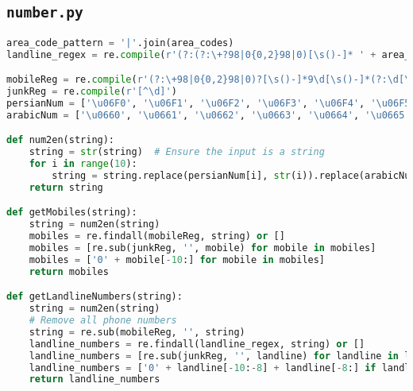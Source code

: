\documentclass{solutionclass} %
\def\co#1{\texttt{#1}}
\begin{document}
\subsection*{\co{number.py}}
\begin{lstlisting}[language=Python]
area_code_pattern = '|'.join(area_codes)
landline_regex = re.compile(r'(?:(?:\+?98|0{0,2}98|0)[\s()-]* ' + area_code_pattern + r')?[\s()-]*(?:\d[\s()-]*){11}|(?:\d[\s()-]*){8}', re.IGNORECASE)

mobileReg = re.compile(r'(?:\+98|0{0,2}98|0)?[\s()-]*9\d[\s()-]*(?:\d[\s()-]*){8}', re.IGNORECASE)
junkReg = re.compile(r'[^\d]')
persianNum = ['\u06F0', '\u06F1', '\u06F2', '\u06F3', '\u06F4', '\u06F5', '\u06F6', '\u06F7', '\u06F8', '\u06F9']
arabicNum = ['\u0660', '\u0661', '\u0662', '\u0663', '\u0664', '\u0665', '\u0666', '\u0667', '\u0668', '\u0669']

def num2en(string):
    string = str(string)  # Ensure the input is a string
    for i in range(10):
        string = string.replace(persianNum[i], str(i)).replace(arabicNum[i], str(i))
    return string

def getMobiles(string):
    string = num2en(string)
    mobiles = re.findall(mobileReg, string) or []
    mobiles = [re.sub(junkReg, '', mobile) for mobile in mobiles]
    mobiles = ['0' + mobile[-10:] for mobile in mobiles]
    return mobiles

def getLandlineNumbers(string):
    string = num2en(string)
    # Remove all phone numbers
    string = re.sub(mobileReg, '', string)
    landline_numbers = re.findall(landline_regex, string) or []
    landline_numbers = [re.sub(junkReg, '', landline) for landline in landline_numbers]
    landline_numbers = ['0' + landline[-10:-8] + landline[-8:] if landline[-10:-8] in area_codes else landline[-8:] for landline in landline_numbers]
    return landline_numbers
\end{lstlisting}
\end{document}
